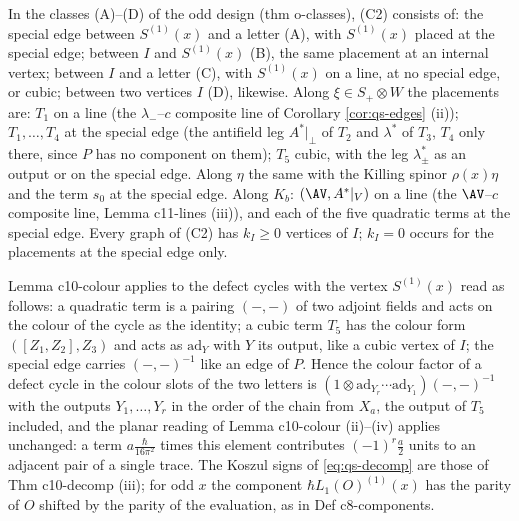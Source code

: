 \begin{remark}
\label{rem:qs-placements}
In the classes (A)--(D) of the odd design (thm o-classes), (C2) consists of: the special edge between $S^{(1)}(x)$ and a letter (A), with $S^{(1)}(x)$ placed at the special edge; between $I$ and $S^{(1)}(x)$ (B), the same placement at an internal vertex; between $I$ and a letter (C), with $S^{(1)}(x)$ on a line, at no special edge, or cubic; between two vertices $I$ (D), likewise. Along $\xi\in S_+\otimes W$ the placements are: $T_1$ on a line (the $\lambda_-$--$c$ composite line of Corollary \ref{cor:qs-edges} (ii)); $T_1,\dots,T_4$ at the special edge (the antifield leg $A^*|_\perp$ of $T_2$ and $\lambda^*$ of $T_3$, $T_4$ only there, since $P$ has no component on them); $T_5$ cubic, with the leg $\lambda^*_\pm$ as an output or on the special edge. Along $\eta$ the same with the Killing spinor $\rho(x)\eta$ and the term $s_0$ at the special edge. Along $K_b$: $(\AV,A^*|_V)$ on a line (the $\AV$--$c$ composite line, Lemma c11-lines (iii)), and each of the five quadratic terms at the special edge. Every graph of (C2) has $k_I\ge0$ vertices of $I$; $k_I=0$ occurs for the placements at the special edge only.
\end{remark}

\begin{remark}
\label{rem:qs-colour}
Lemma c10-colour applies to the defect cycles with the vertex $S^{(1)}(x)$ read as follows: a quadratic term is a pairing $(-,-)$ of two adjoint fields and acts on the colour of the cycle as the identity; a cubic term $T_5$ has the colour form $([Z_1,Z_2],Z_3)$ and acts as $\mathrm{ad}_Y$ with $Y$ its output, like a cubic vertex of $I$; the special edge carries $(-,-)^{-1}$ like an edge of $P$. Hence the colour factor of a defect cycle in the colour slots of the two letters is $(1\otimes\mathrm{ad}_{Y_r}\cdots\mathrm{ad}_{Y_1})(-,-)^{-1}$ with the outputs $Y_1,\dots,Y_r$ in the order of the chain from $X_a$, the output of $T_5$ included, and the planar reading of Lemma c10-colour (ii)--(iv) applies unchanged: a term $a\frac{\hbar}{16\pi^2}$ times this element contributes $(-1)^r\tfrac a2$ units to an adjacent pair of a single trace. The Koszul signs of \eqref{eq:qs-decomp} are those of Thm c10-decomp (iii); for odd $x$ the component $\hbar L_1(O)^{(1)}(x)$ has the parity of $O$ shifted by the parity of the evaluation, as in Def c8-components.
\end{remark}
